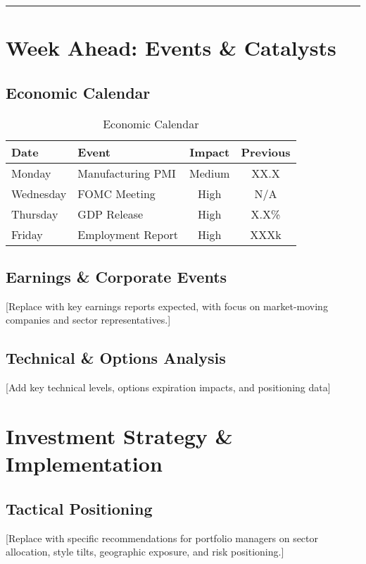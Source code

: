 \documentclass[11pt,a4paper]{article}
\makeatletter
\newenvironment{calendartable}[1][Economic Calendar]{%
    \begin{table}[h]
    \centering
    \caption{#1}
    \footnotesize
    \renewcommand{\arraystretch}{1.3}
    \begin{tabular}{@{}llcc@{}}
    \toprule
    \rowcolor{jetblack!10}
    \textbf{Date} & \textbf{Event} & \textbf{Impact} & \textbf{Previous} \\
    \midrule
}{%
    \bottomrule
    \end{tabular}
    \end{table}
}
\newcommand{\sectionbreak}{%
    \vspace{0.5cm}
    \begin{center}
        \color{mediumgray}
        \rule{0.3\textwidth}{0.4pt}
    \end{center}
    \vspace{0.3cm}
}
\makeatother
\begin{document}
\sectionbreak

\section{Week Ahead: Events \& Catalysts}

\subsection{Economic Calendar}

\begin{calendartable}
Monday & Manufacturing PMI & Medium & XX.X \\
\rowcolor{tablealternate}
Wednesday & FOMC Meeting & High & N/A \\
Thursday & GDP Release & High & X.X\% \\
\rowcolor{tablealternate}
Friday & Employment Report & High & XXXk \\
\end{calendartable}

\subsection{Earnings \& Corporate Events}

[Replace with key earnings reports expected, with focus on market-moving companies and sector representatives.]

\subsection{Technical \& Options Analysis}

[Add key technical levels, options expiration impacts, and positioning data]

\section{Investment Strategy \& Implementation}

\subsection{Tactical Positioning}

[Replace with specific recommendations for portfolio managers on sector allocation, style tilts, geographic exposure, and risk positioning.]
\end{document}
